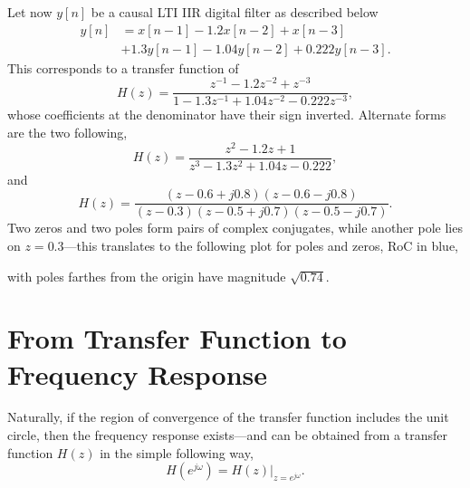 \documentclass[\documentfontsize, twocolumn]{\classname}
\begin{document}
Let now $y[n]$ be a causal LTI IIR digital filter as described below
\begin{align*}
    y[n] &= x[n-1] - 1.2x[n-2] + x[n-3]\\
    &+ 1.3y[n-1] - 1.04y[n-2] + 0.222y[n-3].
\end{align*}
This corresponds to a transfer function of
\[
    H(z) = \frac {
        z^{-1} - 1.2z^{-2} + z^{-3}
    } {
        1 - 1.3z^{-1} + 1.04z^{-2} - 0.222z^{-3}
    },
\]
whose coefficients at the denominator have their sign inverted. Alternate forms are the two following,
\[
    H(z) = \frac {
        z^{2} - 1.2z + 1
    } {
        z^3 - 1.3z^{2} + 1.04z - 0.222
    },
\]
and
\[
    H(z) = \frac {
        (z - 0.6 + j0.8)(z - 0.6 - j0.8)
    } {
        (z-0.3)(z-0.5+j0.7)(z-0.5-j0.7)
    }.
\]
Two zeros and two poles form pairs of complex conjugates, while another pole lies on $z=0.3$---this translates to the following plot for poles and zeros, RoC in blue,
\begin{center}
\end{center}
with poles farthes from the origin have magnitude $\sqrt{0.74}$.

\section{From Transfer Function to Frequency Response}

Naturally, if the region of convergence of the transfer function includes the unit circle, then the frequency response exists---and can be obtained from a transfer function $H(z)$ in the simple following way,
\[
    H(e^{j\omega}) = H(z)\Bigr\rvert_{z=e^{j\omega}}.
\]
\end{document}
